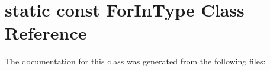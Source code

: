 \hypertarget{classstatic_01const_01ForInType}{}\section{static const For\+In\+Type Class Reference}
\label{classstatic_01const_01ForInType}


The documentation for this class was generated from the following files\+: